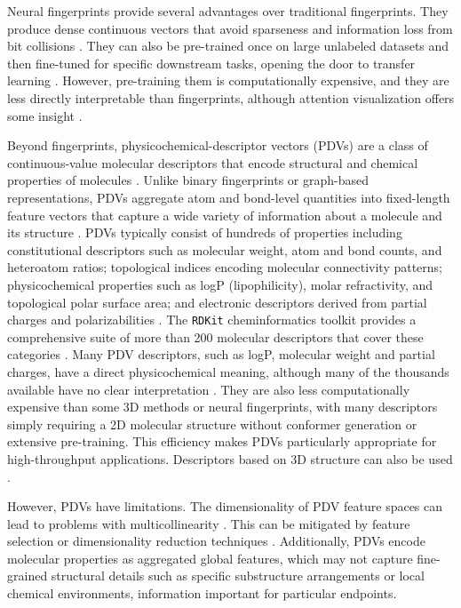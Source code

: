 Neural fingerprints provide several advantages over traditional fingerprints. They produce dense continuous vectors that avoid sparseness and information loss from bit collisions \citep{Jaeger2018}. They can also be pre-trained once on large unlabeled datasets and then fine-tuned for specific downstream tasks, opening the door to transfer learning \citep{Chithrananda2020, Fabian2020}. However, pre-training them is computationally expensive, and they are less directly interpretable than fingerprints, although attention visualization offers some insight \citep{Chithrananda2020}.

Beyond fingerprints, physicochemical-descriptor vectors (PDVs) are a class of continuous-value molecular descriptors that encode structural and chemical properties of molecules \citep{Todeschini2009}. Unlike binary fingerprints or graph-based representations, PDVs aggregate atom and bond-level quantities into fixed-length feature vectors that capture a wide variety of information about a molecule and its structure \citep{Mauri2006}. PDVs typically consist of hundreds of properties including constitutional descriptors such as molecular weight, atom and bond counts, and heteroatom ratios; topological indices encoding molecular connectivity patterns; physicochemical properties such as logP (lipophilicity), molar refractivity, and topological polar surface area; and electronic descriptors derived from partial charges and polarizabilities \citep{Todeschini2009, Cherkasov2014}. The \texttt{RDKit} cheminformatics toolkit provides a comprehensive suite of more than 200 molecular descriptors that cover these categories \citep{rdkit}. Many PDV descriptors, such as logP, molecular weight and partial charges, have a direct physicochemical meaning, although many of the thousands available have no clear interpretation \citep{Cherkasov2014}. They are also less computationally expensive than some 3D methods or neural fingerprints, with many descriptors simply requiring a 2D molecular structure without conformer generation or extensive pre-training. This efficiency makes PDVs particularly appropriate for high-throughput applications. Descriptors based on 3D structure can also be used \citep{Mauri2006}.

However, PDVs have limitations. The dimensionality of PDV feature spaces can lead to problems with multicollinearity \citep{Todeschini2009}. This can be mitigated by feature selection or dimensionality reduction techniques \citep{Cherkasov2014}. Additionally, PDVs encode molecular properties as aggregated global features, which may not capture fine-grained structural details such as specific substructure arrangements or local chemical environments, information important for particular endpoints.

